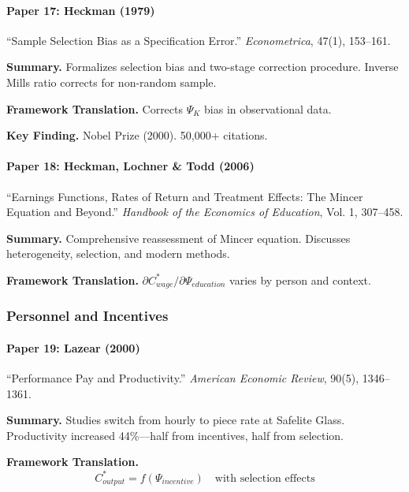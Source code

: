 \paragraph{Paper 17: Heckman (1979)}

``Sample Selection Bias as a Specification Error.''
\textit{Econometrica}, 47(1), 153--161.

\textbf{Summary.}
Formalizes selection bias and two-stage correction procedure. 
Inverse Mills ratio corrects for non-random sample.

\textbf{Framework Translation.}
Corrects $\Psi_K$ bias in observational data.

\textbf{Key Finding.}
Nobel Prize (2000). 50,000+ citations.

\paragraph{Paper 18: Heckman, Lochner \& Todd (2006)}

``Earnings Functions, Rates of Return and Treatment Effects: The Mincer 
Equation and Beyond.''
\textit{Handbook of the Economics of Education}, Vol. 1, 307--458.

\textbf{Summary.}
Comprehensive reassessment of Mincer equation. Discusses heterogeneity, 
selection, and modern methods.

\textbf{Framework Translation.}
$\partial C^*_{wage}/\partial \Psi_{education}$ varies by person and context.

\subsubsection{Personnel and Incentives}

\paragraph{Paper 19: Lazear (2000)}

``Performance Pay and Productivity.''
\textit{American Economic Review}, 90(5), 1346--1361.

\textbf{Summary.}
Studies switch from hourly to piece rate at Safelite Glass. Productivity 
increased 44\%---half from incentives, half from selection.

\textbf{Framework Translation.}
\begin{equation}
C^*_{output} = f(\Psi_{incentive}) \quad \text{with selection effects}
\end{equation}

